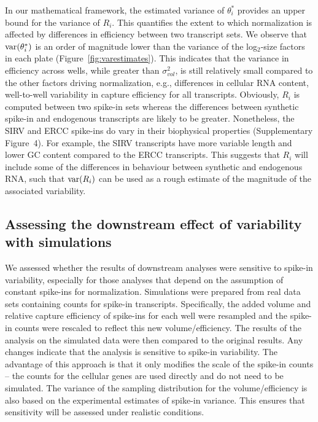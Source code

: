 \documentclass{article}
\newcommand{\suppfigbiophys}{4}
\begin{document}
In our mathematical framework, the estimated variance of $\theta^*_i$ provides an upper bound for the variance of $R_i$.
This quantifies the extent to which normalization is affected by differences in efficiency between two transcript sets.
We observe that $\mbox{var}(\theta^*_i)$ is an order of magnitude lower than the variance of the log$_2$-size factors in each plate (Figure~\ref{fig:varestimates}).
This indicates that the variance in efficiency across wells, while greater than $\sigma^2_{vol}$, is still relatively small compared to the other factors driving normalization, e.g., differences in cellular RNA content, well-to-well variability in capture efficiency for all transcripts.
Obviously, $R_i$ is computed between two spike-in sets whereas the differences between synthetic spike-in and endogenous transcripts are likely to be greater.
Nonetheless, the SIRV and ERCC spike-ins do vary in their biophysical properties (Supplementary Figure~\suppfigbiophys{}).
For example, the SIRV transcripts have more variable length and lower GC content compared to the ERCC transcripts.
This suggests that $R_i$ will include some of the differences in behaviour between synthetic and endogenous RNA, such that $\mbox{var}(R_i)$ can be used as a rough estimate of the magnitude of the associated variability.

\subsection{Assessing the downstream effect of variability with simulations}
We assessed whether the results of downstream analyses were sensitive to spike-in variability, especially for those analyses that depend on the assumption of constant spike-ins for normalization.
Simulations were prepared from real data sets containing counts for spike-in transcripts.
Specifically, the added volume and relative capture efficiency of spike-ins for each well were resampled and the spike-in counts were rescaled to reflect this new volume/efficiency.
The results of the analysis on the simulated data were then compared to the original results.
Any changes indicate that the analysis is sensitive to spike-in variability.
The advantage of this approach is that it only modifies the scale of the spike-in counts -- the counts for the cellular genes are used directly and do not need to be simulated.
The variance of the sampling distribution for the volume/efficiency is also based on the experimental estimates of spike-in variance.
This ensures that sensitivity will be assessed under realistic conditions. 
\end{document}
